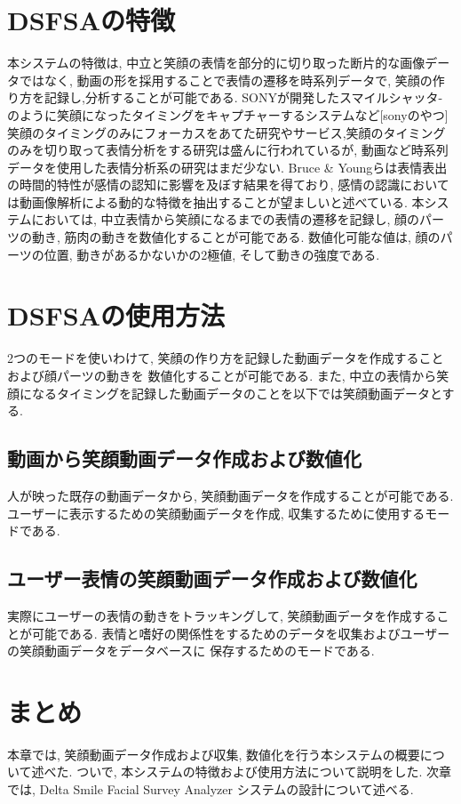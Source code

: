 \section{DSFSAの特徴}
本システムの特徴は, 中立と笑顔の表情を部分的に切り取った断片的な画像データではなく,
動画の形を採用することで表情の遷移を時系列データで, 笑顔の作り方を記録し,分析することが可能である.
SONYが開発したスマイルシャッタ-のように笑顔になったタイミングをキャプチャーするシステムなど[sonyのやつ]
笑顔のタイミングのみにフォーカスをあてた研究やサービス,笑顔のタイミングのみを切り取って表情分析をする研究は盛んに行われているが,
動画など時系列データを使用した表情分析系の研究はまだ少ない.
Bruce \& Youngらは表情表出の時間的特性が感情の認知に影響を及ぼす結果を得ており\cite{kokada},
感情の認識においては動画像解析による動的な特徴を抽出することが望ましいと述べている.\cite{yukitakahashi}
本システムにおいては, 中立表情から笑顔になるまでの表情の遷移を記録し,
顔のパーツの動き, 筋肉の動きを数値化することが可能である.
数値化可能な値は, 顔のパーツの位置, 動きがあるかないかの2極値, そして動きの強度である.

\section{DSFSAの使用方法}
2つのモードを使いわけて, 笑顔の作り方を記録した動画データを作成することおよび顔パーツの動きを
数値化することが可能である.
また, 中立の表情から笑顔になるタイミングを記録した動画データのことを以下では笑顔動画データとする.
\subsection{動画から笑顔動画データ作成および数値化}
人が映った既存の動画データから, 笑顔動画データを作成することが可能である.
ユーザーに表示するための笑顔動画データを作成, 収集するために使用するモードである.
\subsection{ユーザー表情の笑顔動画データ作成および数値化}
実際にユーザーの表情の動きをトラッキングして, 笑顔動画データを作成することが可能である.
表情と嗜好の関係性をするためのデータを収集およびユーザーの笑顔動画データをデータベースに
保存するためのモードである.

\section{まとめ}
本章では, 笑顔動画データ作成および収集, 数値化を行う本システムの概要について述べた.
ついで, 本システムの特徴および使用方法について説明をした.
次章では, Delta Smile Facial Survey Analyzer システムの設計について述べる.
